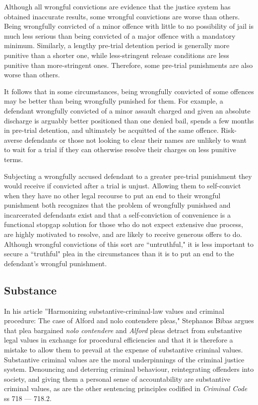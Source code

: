 Although all wrongful convictions are evidence that the justice system has obtained inaccurate results, some wrongful convictions are worse than others. Being wrongfully convicted of a minor offence with little to no possibility of jail is much less serious than being convicted of a major offence with a mandatory minimum. Similarly, a lengthy pre-trial detention period is generally more punitive than a shorter one, while less-stringent release conditions are less punitive than more-stringent ones. Therefore, some pre-trial punishments are also worse than others. 

It follows that in some circumstances, being wrongfully convicted of some offences may be better than being wrongfully punished for them. For example, a defendant wrongfully convicted of a minor assault charged and given an absolute discharge is arguably better positioned than one denied bail, spends a few months in pre-trial detention, and ultimately be acquitted of the same offence. Risk-averse defendants or those not looking to clear their names are unlikely to want to wait for a trial if they can otherwise resolve their charges on less punitive terms. 

Subjecting a wrongfully accused defendant to a greater pre-trial punishment they would receive if convicted after a trial is unjust. Allowing them to self-convict when they have no other legal recourse to put an end to their wrongful punishment both recognizes that the problem of wrongfully punishsed and incarcerated defendants exist and that a self-conviction of convenience is a functional stopgap solution for those who do not expect extensive due process, are highly motivated to resolve, and are likely to receive generous offers to do. Although wrongful convictions of this sort are ``untruthful," it is less important to secure a ``truthful" plea in the circumstances than it is to put an end to the defendant's wrongful punishment.

\subsection{Substance}

In his article ''Harmonizing substantive-criminal-law values and criminal procedure: The case of Alford and nolo contendere pleas," Stephanos Bibas argues that plea bargained \textit{nolo contendere} and \textit{Alford} pleas detract from substantive legal values in exchange for procedural efficiencies and that it is therefore a mistake to allow them to prevail at the expense of substantive criminal values. Substantive criminal values are the moral underpinnings of the criminal justice system. Denouncing and deterring criminal behaviour, reintegrating offenders into society, and giving them a personal sense of accountability are substantive criminal values, as are the other sentencing principles codified in \textit{Criminal Code} ss 718 — 718.2.

